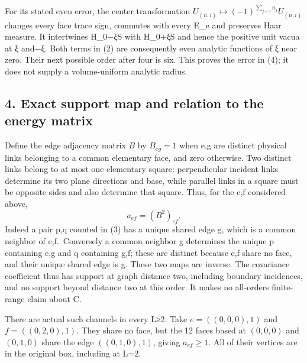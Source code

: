 \documentclass[
  11pt,
]{article}
\begin{document}
For its stated even error, the center transformation
\(U_{(n,i)}\mapsto(-1)^{\sum_{j<i}n_j}U_{(n,i)}\) changes every face
trace sign, commutes with every E\_e and preserves Haar measure. It
intertwines H\_0−ξS with H\_0+ξS and hence the positive unit vacua at ξ
and−ξ. Both terms in (2) are consequently even analytic functions of ξ
near zero. Their next possible order after four is six. This proves the
error in (4); it does not supply a volume-uniform analytic radius.

\subsection{4. Exact support map and relation to the energy
matrix}\label{magnetic-part-10-exact-support-map-and-relation-to-the-energy-matrix}

Define the edge adjacency matrix \(B\) by \(B_{eg}=1\) when e,g are
distinct physical links belonging to a common elementary face, and zero
otherwise. Two distinct links belong to at most one elementary square:
perpendicular incident links determine its two plane directions and
base, while parallel links in a square must be opposite sides and also
determine that square. Thus, for the e,f considered above, \[
 \boxed{a_{ef}=(B^2)_{ef}.}
\tag{12}
\] Indeed a pair p,q counted in (3) has a unique shared edge g, which is
a common neighbor of e,f.~Conversely a common neighbor g determines the
unique p containing e,g and q containing g,f; these are distinct because
e,f share no face, and their unique shared edge is g. These two maps are
inverse. The covariance coefficient thus has support at graph distance
two, including boundary incidences, and no support beyond distance two
at this order. It makes no all-orders finite-range claim about C.

There are actual such channels in every L≥2. Take \(e=((0,0,0),1)\) and
\(f=((0,2,0),1)\). They share no face, but the 12 faces based at
\((0,0,0)\) and \((0,1,0)\) share the edge \(((0,1,0),1)\), giving
\(a_{ef}\geq1\). All of their vertices are in the original box,
including at L=2.
\end{document}
